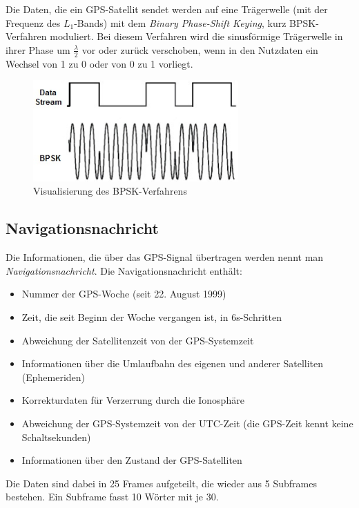 \documentclass[12pt,a4paper]{scrartcl}
\begin{document}
Die Daten, die ein GPS-Satellit sendet werden auf eine Trägerwelle (mit der Frequenz des $L_1$-Bands) mit dem \emph{Binary Phase-Shift Keying}, kurz BPSK-Verfahren moduliert.
Bei diesem Verfahren wird die sinusförmige Trägerwelle in ihrer Phase um $\frac{\lambda}{2}$ vor oder zurück verschoben, wenn in den Nutzdaten ein Wechsel von 1 zu 0 oder von 0 zu 1 vorliegt.

\begin{figure}[H]
\centering
\includegraphics[width=0.7\textwidth]{img/bpsk.jpg}
\caption{Visualisierung des BPSK-Verfahrens\cite{evalidate_bpsk}}
\label{fig:bpsk}
\end{figure}

\subsection{Navigationsnachricht}
Die Informationen, die über das GPS-Signal übertragen werden nennt man \emph{Navigationsnachricht}. Die Navigationsnachricht enthält:
\begin{itemize}
\item Nummer der GPS-Woche (seit 22. August 1999)
\item Zeit, die seit Beginn der Woche vergangen ist, in 6s-Schritten
\item Abweichung der Satellitenzeit von der GPS-Systemzeit
\item Informationen über die Umlaufbahn des eigenen und anderer Satelliten (Ephemeriden)
\item Korrekturdaten für Verzerrung durch die Ionosphäre
\item Abweichung der GPS-Systemzeit von der UTC-Zeit (die GPS-Zeit kennt keine Schaltsekunden)
\item Informationen über den Zustand der GPS-Satelliten
\end{itemize}
\cite{infotip_gps}

Die Daten sind dabei in 25 Frames aufgeteilt, die wieder aus 5 Subframes bestehen. Ein Subframe fasst 10 Wörter mit je \SI{30}{\bit}.
\end{document}
